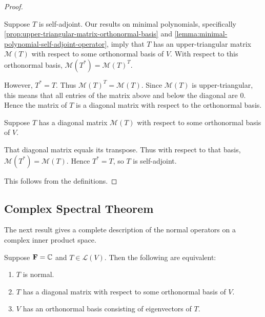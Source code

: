 \begin{proof} \

 Suppose $T$ is self-adjoint. 
Our results on minimal polynomials, specifically \ref{prop:upper-triangular-matrix-orthonormal-basis} and \ref{lemma:minimal-polynomial-self-adjoint-operator}, imply that $T$ has an upper-triangular matrix $\mathcal{M}(T)$ with respect to some orthonormal basis of $V$. With respect to this orthonormal basis, $\mathcal{M}(T^*)=\mathcal{M}(T)^T$. 

However, $T^*=T$.
Thus $\mathcal{M}(T)^T=\mathcal{M}(T)$. Since $\mathcal{M}(T)$ is upper-triangular, this means that all entries of the matrix above and below the diagonal are $0$. Hence the matrix of $T$ is a diagonal matrix with respect to the orthonormal basis.

 Suppose $T$ has a diagonal matrix $\mathcal{M}(T)$ with respect to some orthonormal basis of $V$. 

That diagonal matrix equals its transpose. Thus with respect to that basis, $\mathcal{M}(T^*)=\mathcal{M}(T)$. Hence $T^*=T$, so $T$ is self-adjoint.

 This follows from the definitions.
\end{proof}
\pagebreak

\subsection{Complex Spectral Theorem}
The next result gives a complete description of the normal operators on a complex inner product space.

\begin{theorem}\label{thrm:complex-spectral-theorem}
Suppose $\mathbf F=\mathbb C$ and $T\in\mathcal{L}(V)$. Then the following are equivalent:
\begin{enumerate}[label=(\roman*)]
\item $T$ is normal.
\item $T$ has a diagonal matrix with respect to some orthonormal basis of $V$.
\item $V$ has an orthonormal basis consisting of eigenvectors of $T$.
\end{enumerate}
\end{theorem}

